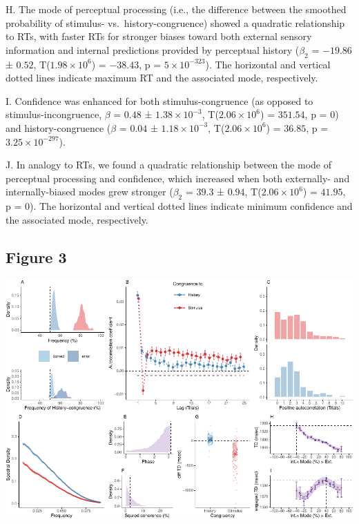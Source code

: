 \documentclass[
]{article}
\begin{document}
H. The mode of perceptual processing (i.e., the difference between the
smoothed probability of stimulus- vs.~history-congruence) showed a
quadratic relationship to RTs, with faster RTs for stronger biases
toward both external sensory information and internal predictions
provided by perceptual history (\(\beta_2\) = \(-19.86\) ± \(0.52\),
T(\(\ensuremath{1.98\times 10^{6}}\)) = \(-38.43\), p =
\(\ensuremath{5\times 10^{-323}}\)). The horizontal and vertical dotted
lines indicate maximum RT and the associated mode, respectively.

I. Confidence was enhanced for both stimulus-congruence (as opposed to
stimulus-incongruence, \(\beta\) = \(0.48\) ±
\(\ensuremath{1.38\times 10^{-3}}\),
T(\(\ensuremath{2.06\times 10^{6}}\)) = \(351.54\), p = \(0\)) and
history-congruence (\(\beta\) = \(0.04\) ±
\(\ensuremath{1.18\times 10^{-3}}\),
T(\(\ensuremath{2.06\times 10^{6}}\)) = \(36.85\), p =
\(\ensuremath{3.25\times 10^{-297}}\)).

J. In analogy to RTs, we found a quadratic relationship between the mode
of perceptual processing and confidence, which increased when both
externally- and internally-biased modes grew stronger (\(\beta_2\) =
\(39.3\) ± \(0.94\), T(\(\ensuremath{2.06\times 10^{6}}\)) = \(41.95\),
p = \(0\)). The horizontal and vertical dotted lines indicate minimum
confidence and the associated mode, respectively.

\hypertarget{figure-3}{%
\subsection{Figure 3}\label{figure-3}}

\includegraphics{modes_mouse_rev1b_files/figure-latex/Figure_3-1.pdf}
\end{document}
